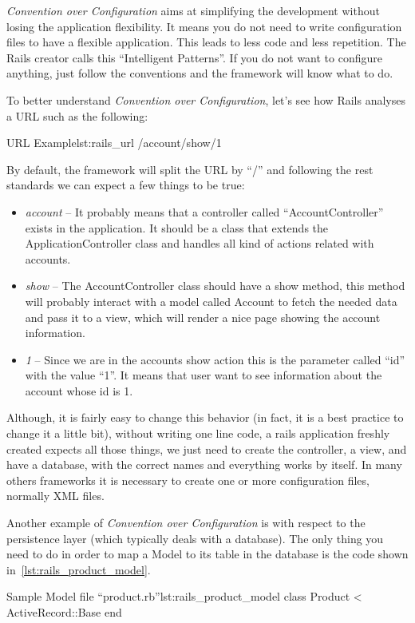 \emph{Convention over Configuration} aims at simplifying the development without losing the application flexibility. 
It means you do not need to write configuration files to have a flexible application. 
This leads to less code and less repetition.
The Rails creator calls this “Intelligent Patterns”. 
If you do not want to configure anything, just follow the conventions and the framework will know what to do.

To better understand \emph{Convention over Configuration}, 
let's see how Rails analyses a URL such as the following:

\begin{rubycode}{URL Example}{lst:rails_url}
  /account/show/1

\end{rubycode}
By default, the framework will split the URL by “/” and following the rest standards 
we can expect a few things to be true: 

\begin{itemize}
\item \emph{account} – It probably means that a controller called “AccountController” exists in the application. It should be a class that extends the ApplicationController class and handles all kind of actions related with accounts.
\item \emph{show} – The AccountController class should have a show method, 
this method will probably interact with a model called Account to fetch the needed data and pass it to a view, 
which will render a nice page showing the account information.
\item \emph{1} – Since we are in the accounts show action this is the parameter called “id” with the value “1”. 
It means that user want to see information about the account whose id is 1. 
\end{itemize}

Although, it is fairly easy to change this behavior (in fact, it is a best practice to change it a little bit), 
without writing one line code, a rails application freshly created expects all those things, 
we just need to create the controller, a view, and have a database, with the correct names and everything works by itself. 
In many others frameworks it is necessary to create one or more configuration files, normally XML files.

Another example of \emph{Convention over Configuration} is with respect to the persistence layer 
(which typically deals with a database). 
The only thing you need to do in order to map a Model to its table in the database is 
the code shown in~\ref{lst:rails_product_model}.
\begin{rubycode}{Sample Model file “product.rb”}{lst:rails_product_model}
class Product < ActiveRecord::Base 
end
\end{rubycode}

